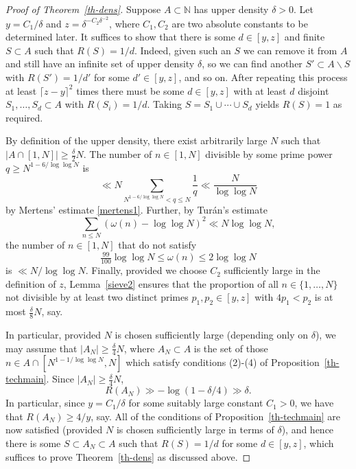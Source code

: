 \documentclass{amsart}
\newcommand{\bbn}{\mathbb{N}}
\newcommand{\abs}[1]{\left\lvert #1\right\rvert}
\begin{document}
\begin{proof}[Proof of Theorem~\ref{th-dens}]
Suppose $A\subset \bbn$ has upper density $\delta>0$. Let $y=C_1/\delta$ and $z=\delta^{-C_2\delta^{-2}}$, where $C_1,C_2$ are two absolute constants to be determined later. It suffices to show that there is some $d\in [y,z]$ and finite $S\subset A$ such that $R(S)=1/d$. Indeed, given such an $S$ we can remove it from $A$ and still have an infinite set of upper density $\delta$, so we can find another $S'\subset A\backslash S$ with $R(S')=1/d'$ for some $d'\in [y,z]$, and so on. After repeating this process at least $\lceil z-y\rceil^2$ times there must be some $d\in [y,z]$ with at least $d$ disjoint $S_1,\ldots,S_d\subset A$ with $R(S_i)=1/d$. Taking $S=S_1\cup\cdots \cup S_d$ yields $R(S)=1$ as required.

By definition of the upper density, there exist arbitrarily large $N$ such that $\abs{A\cap [1,N]}\geq \frac{\delta}{2}N$. The number of $n\in [1,N]$ divisible by some prime power $q\geq N^{1-6/\log\log N}$ is
\[\ll N \sum_{N^{1-6/\log\log N}<q\leq N}\frac{1}{q}\ll \frac{N}{\log\log N}\]
by Mertens' estimate \eqref{mertens1}. Further, by Tur\'{a}n's estimate
\[\sum_{n\leq N}(\omega(n)-\log\log N)^2 \ll N \log\log N,\]
the number of $n\in [1,N]$ that do not satisfy 
\begin{equation}\label{divs}
\tfrac{99}{100}\log\log N\leq \omega(n) \leq 2\log\log N
\end{equation}
is $\ll N/\log\log N$. Finally, provided we choose $C_2$ sufficiently large in the definition of $z$, Lemma~\ref{sieve2} ensures that the proportion of all $n\in \{1,\ldots,N\}$ not divisible by at least two distinct primes $p_1,p_2\in [y,z]$ with $4p_1<p_2$ is at most $\frac{\delta}{8}N$, say. 

In particular, provided $N$ is chosen sufficiently large (depending only on $\delta$), we may assume that $\abs{A_N}\geq \frac{\delta}{4}N$, where $A_N\subset A$ is the set of those $n\in A\cap [N^{1-1/\log\log N},N]$ which satisfy conditions (2)-(4) of Proposition~\ref{th-techmain}. Since $\abs{A_N}\geq \frac{\delta}{4}N$, 
\[R(A_N) \gg -\log(1-\delta/4)\gg \delta.\]
In particular, since $y=C_1/\delta$ for some suitably large constant $C_1>0$, we have that $R(A_N)\geq 4/y$, say. All of the conditions of Proposition~\ref{th-techmain} are now satisfied (provided $N$ is chosen sufficiently large in terms of $\delta$), and hence there is some $S\subset A_N\subset A$ such that $R(S)=1/d$ for some $d\in [y,z]$, which suffices to prove Theorem~\ref{th-dens} as discussed above. 
\end{proof}
\end{document}
